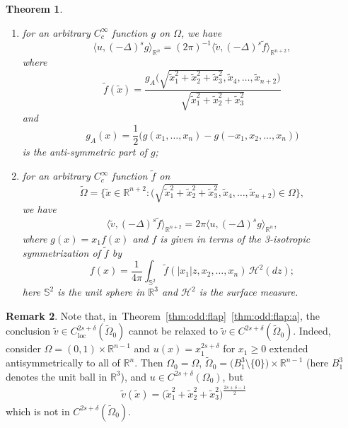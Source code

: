 \documentclass[a4paper,12pt,reqno]{amsart}
\numberwithin{equation}{section}
\newtheorem{theorem}{Theorem}[section]
\theoremstyle{definition}
\newtheorem{remark}[theorem]{Remark}
\theoremstyle{notation}
\newcommand{\R}{\mathds{R}}
\newcommand{\sph}{\mathds{S}}
\begin{document}
\begin{theorem}
\begin{enumerate}[label={\rm (\alph*)}]
\begin{equation}
\label{eq:odd:flap}
 (-\Delta)^s u(x) = x_1 (-\Delta)^s \tilde{v}((x_1, 0, 0), x_2, \ldots, x_n) ;
\end{equation}
\item\label{thm:odd:flap:d} for an arbitrary $C_c^\infty$ function $g$ on $\Omega$, we have
\begin{equation}
\label{eq:odd:flap:weak}
 \langle u, (-\Delta)^s g \rangle_{\R^n} = (2 \pi)^{-1} \langle \tilde{v}, (-\Delta)^s \tilde{f} \rangle_{\R^{n + 2}} ,
\end{equation}
where%
\[
 \tilde f(\tilde x)= \frac{ g_A\big (\sqrt{\tilde{x}_1^2 + \tilde{x}_2^2 + \tilde{x}_3^2}, \tilde{x}_4, \ldots, \tilde{x}_{n + 2} \big )}{\sqrt{\tilde{x}_1^2 + \tilde{x}_2^2 + \tilde{x}_3^2}}
\]
and
\[
g_A(x) = \frac 12 \big (  g(x_1,\dots,x_n) - g(-x_1,x_2,\dots,x_n) \big ) %
\]
is the anti-symmetric part of $g$;
\item\label{thm:odd:flap:e} for an arbitrary $C_c^\infty$ function $\tilde{f}$ on %
\[\tilde \Omega=\bigg \{\tilde{x} \in \R^{n + 2} : \Big (\sqrt{\tilde{x}_1^2 + \tilde{x}_2^2 + \tilde{x}_3^2}, \tilde{x}_4, \ldots, \tilde{x}_{n + 2}\Big ) \in \Omega\bigg \} ,
\]
we have
\begin{equation}
\label{eq:odd:flap:reverse}
\langle \tilde{v}, (-\Delta)^s \tilde{f} \rangle_{\R^{n + 2}} = 2 \pi \langle u, (-\Delta)^s g \rangle_{\R^n} ,
\end{equation}
where $g(x) = x_1 f(x)$ and $f$ is given in terms of the 3-isotropic symmetrization of $\tilde{f}$ by
\begin{equation}\label{ISODEF}
 f(x) = \frac{1}{4 \pi} \int_{\sph^2} \tilde{f}(|x_1| z, x_2, \ldots, x_n)\, \mathcal H^2(dz) ;
\end{equation}
here $\sph^2$ is the unit sphere in $\R^3$ and $\mathcal H^2$ is the surface measure.
\end{enumerate}
\end{theorem}


\begin{remark}
Note that, in~Theorem~\ref{thm:odd:flap}~\ref{thm:odd:flap:a}, the conclusion $\tilde v\in C^{2s+\delta}_{\mathrm{loc}}(\tilde \Omega_0)$ cannot be relaxed to $\tilde v\in C^{2s+\delta}(\tilde \Omega_0)$. Indeed, consider $\Omega = (0,1) \times \R^{n-1}$ and $u(x) = x_1^{2s+\delta}$ for $x_1\geq 0$ extended antisymmetrically to all of $\R^n$. Then $\Omega_0=\Omega$, $\tilde \Omega_0 =\big (  B_1^3\setminus \{0\}\big ) \times \R^{n-1}$ (here $B^3_1$ denotes the unit ball in $\R^3$), and $u\in C^{2s+\delta}(\Omega_0)$, but \begin{align*}
\tilde v(\tilde x ) = \big ( \tilde x_1^2+\tilde x_2^2+\tilde x_3^2 \big ) ^{\frac{2s+\delta-1} 2 } 
\end{align*} which is not in $C^{2s+\delta} (\tilde \Omega_0)$. 
\end{remark}
\end{document}

